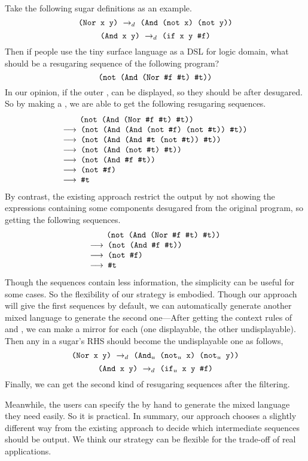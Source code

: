 Take the following sugar definitions as an example.
\[
\texttt{(Nor~x~y)} ~\rightarrow_d~ \texttt{(And~(not~x)~(not~y))}
\]
\[
\texttt{(And~x~y)} ~\rightarrow_d~ \texttt{(if~x~y~\#f)}
\]
Then if people use the tiny surface language as a DSL for logic domain, what should be a resugaring sequence of the following program? 
\[
	\texttt{(not (And (Nor \#f~\#t) \#t))} 
\]
In our opinion, if the outer ,  can be displayed, so they should be after desugared. So by making  a , we are able to get the following resugaring sequences.
\[
	\begin{array}{l}
		\qquad\Code{(not (And (Nor \false~\true) \true))}\\
		\OneStep{\Code{ (not (And (And (not \false) (not \true)) \true))}}\\
		\OneStep{\Code{ (not (And (And \true~(not \true)) \true))}}\\
		\OneStep{\Code{ (not (And (not \true) \true))}}\\
		\OneStep{\Code{ (not (And \false~\true))}}\\
		\OneStep{\Code{ (not \false)}}\\
		\OneStep{\Code{ \true}}\\
	\end{array}
\]
By contrast, the existing approach restrict the output by not showing the expressions containing some components desugared from the original program, so getting the following sequences.
\[
	\begin{array}{l}
		\qquad\Code{(not (And (Nor \false~\true) \true))}\\
		\OneStep{\Code{ (not (And \false~\true))}}\\
		\OneStep{\Code{ (not \false)}}\\
		\OneStep{\Code{ \true}}\\
	\end{array}
\]
Though the sequences contain less information, the simplicity can be useful for some cases. So the flexibility of our strategy is embodied. Though our approach will give the first sequences by default, we can automatically generate another mixed language to generate the second one---After getting the context rules of  and , we can make a mirror for each  (one displayable, the other undisplayable). Then any  in a sugar's RHS should become the undisplayable one as follows,
\[
\texttt{(Nor~x~y)} ~\rightarrow_d~ \texttt{($\mbox{\tt And}_u$~($\mbox{\tt not}_u$~x)~($\mbox{\tt not}_u$~y))}
\]
\[
\texttt{(And~x~y)} ~\rightarrow_d~ \texttt{($\mbox{\tt if}_u$~x~y~\#f)}
\]
Finally, we can get the second kind of resugaring sequences after the filtering.

Meanwhile, the users can specify the  by hand to generate the mixed language they need easily. So it is practical.
In summary, our approach chooses a slightly different way from the existing approach to decide which intermediate sequences should be output. We think our strategy can be flexible for the trade-off of real applications.
